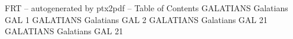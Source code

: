 \id FRT -- autogenerated by ptx2pdf --
\is Table of Contents
\tr {} GALATIANS Galatians GAL 1
\tr {} GALATIANS Galatians GAL 2
\tr {} GALATIANS Galatians GAL 21
\tr {} GALATIANS Galatians GAL 21
